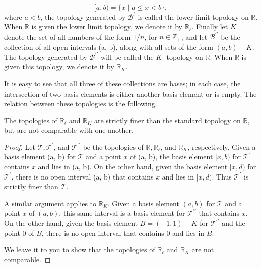 \[
\lbrack a,b) = \{ x \mid a \leq x < b\},
\]
where \(a < b\), the topology generated by \(\mathcal{B}^{\prime }\) is called the lower limit topology on \(\mathbb{R}\). When \(\mathbb{R}\) is given the lower limit topology, we denote it by \( \mathbb{R}_{\ell }\). Finally let \(K\) denote the set of all numbers of the form \(1/n\), for \(n \in {\mathbb{Z}}_{ + }\), and let \(\mathcal{B}^{\prime \prime }\) be the collection of all open intervals (a, b), along with all sets of the form \(( {a,b}) - K\). The topology generated by \(\mathcal{B}^{\prime \prime }\) will be called the \(K\) -topology on \(\mathbb{R}\). When \(\mathbb{R}\) is given this topology, we denote it by \( \mathbb{R}_{K}\).

It is easy to see that all three of these collections are bases; in each case, the intersection of two basis elements is either another basis element or is empty. The relation between these topologies is the following.

\begin{lemma}
\label{lem:\thetheorem}
 The topologies of \(\mathbb{R}_{\ell }\) and \(\mathbb{R}_{K}\) are strictly finer than the standard topology on \(\mathbb{R}\), but are not comparable with one another.
\end{lemma}

\begin{proof}
 Let \(\mathcal{T},\mathcal{T}^{\prime }\), and \(\mathcal{T}^{\prime \prime }\) be the topologies of \(\mathbb{R},\mathbb{R}_{\ell }\), and \(\mathbb{R}_{K}\), respectively. Given a basis element (a, b) for \(\mathcal{T}\) and a point \(x\) of (a, b), the basis element \(\lbrack x,b)\) for \(\mathcal{T}^{\prime }\) contains \(x\) and lies in (a, b). On the other hand, given the basis element \(\lbrack x,d)\) for \(\mathcal{T}^{\prime }\), there is no open interval (a, b) that contains \(x\) and lies in \(\lbrack x,d)\). Thus \(\mathcal{T}^{\prime }\) is strictly finer than \(\mathcal{T}\).

 A similar argument applies to \(\mathbb{R}_{K}\). Given a basis element \((a, b)\) for \(\mathcal{T}\) and a point \(x\) of \((a, b)\), this same interval is a basis element for \(\mathcal{T}^{\prime \prime }\) that contains \(x\). On the other hand, given the basis element \(B = ( {-1,1}) - K\) for \(\mathcal{T}^{\prime \prime }\) and the point 0 of \(B\), there is no open interval that contains 0 and lies in \(B\).

 We leave it to you to show that the topologies of \(\mathbb{R}_{\ell }\) and \(\mathbb{R}_{K}\) are not comparable.
\end{proof}

